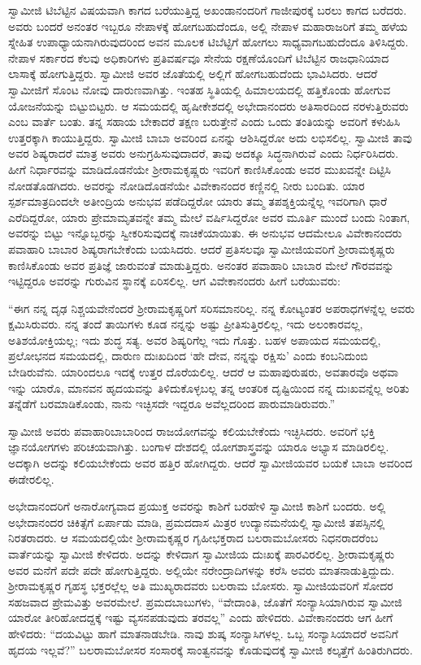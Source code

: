  ಸ್ವಾಮೀಜಿ ಟಿಬೆಟ್ಟಿನ ವಿಷಯವಾಗಿ ಕಾಗದ ಬರೆಯುತ್ತಿದ್ದ ಅಖಂಡಾನಂದರಿಗೆ ಗಾಜೀಪುರಕ್ಕೆ ಬರಲು ಕಾಗದ ಬರೆದರು. ಅವರು ಬಂದರೆ ಅನಂತರ ಇಬ್ಬರೂ ನೇಪಾಳಕ್ಕೆ ಹೋಗಬಹುದೆಂದೂ, ಅಲ್ಲಿ ನೇಪಾಳ ಮಹಾರಾಜರಿಗೆ ತಮ್ಮ ಹಳೆಯ ಸ್ನೇಹಿತ ಉಪಾಧ್ಯಾಯನಾಗಿರುವುದರಿಂದ ಅವನ ಮೂಲಕ ಟಿಬೆಟ್ಟಿಗೆ ಹೋಗಲು ಸಾಧ್ಯವಾಗಬಹುದೆಂದೂ ತಿಳಿಸಿದ್ದರು. ನೇಪಾಳ ಸರ್ಕಾರದ ಕೆಲವು ಅಧಿಕಾರಿಗಳು ಪ್ರತಿವರ್ಷವೂ ಸೇನೆಯ ರಕ್ಷಣೆಯೊಂದಿಗೆ ಟಿಬೆಟ್ಟಿನ ರಾಜಧಾನಿಯಾದ ಲಾಸಾಕ್ಕೆ ಹೋಗುತ್ತಿದ್ದರು. ಸ್ವಾಮೀಜಿ ಅವರ ಜೊತೆಯಲ್ಲಿ ಅಲ್ಲಿಗೆ ಹೋಗಬಹುದೆಂದು ಭಾವಿಸಿದರು. ಆದರೆ ಸ್ವಾಮೀಜಿಗೆ ಸೊಂಟ ನೋವು ದಾರುಣವಾಗಿತ್ತು. ಇಂತಹ ಸ್ಥಿತಿಯಲ್ಲಿ ಹಿಮಾಲಯದಲ್ಲಿ ಹತ್ತಿಕೊಂಡು ಹೋಗುವ ಯೋಜನೆಯನ್ನು ಬಿಟ್ಟುಬಿಟ್ಟರು. ಆ ಸಮಯದಲ್ಲಿ ಹೃಷೀಕೇಶದಲ್ಲಿ ಅಭೇದಾನಂದರು ಅತಿಸಾರದಿಂದ ನರಳುತ್ತಿರುವರು ಎಂಬ ವಾರ್ತೆ ಬಂತು. ತನ್ನ ಸಹಾಯ ಬೇಕಾದರೆ ತಕ್ಷಣ ಬರುತ್ತೇನೆ ಎಂದು ಒಂದು ತಂತಿಯನ್ನು ಅವರಿಗೆ ಕಳುಹಿಸಿ ಉತ್ತರಕ್ಕಾಗಿ ಕಾಯುತ್ತಿದ್ದರು. ಸ್ವಾಮೀಜಿ ಬಾಬಾ ಅವರಿಂದ ಏನನ್ನು ಆಶಿಸಿದ್ದರೋ ಅದು ಲಭಿಸಲಿಲ್ಲ. ಸ್ವಾಮೀಜಿ ತಾವು ಅವರ ಶಿಷ್ಯರಾದರೆ ಮಾತ್ರ ಅವರು ಅನುಗ್ರಹಿಸುವುದಾದರೆ, ತಾವು ಅದಕ್ಕೂ ಸಿದ್ಧನಾಗಿರುವೆ ಎಂದು ನಿರ್ಧರಿಸಿದರು. ಹೀಗೆ ನಿರ್ಧಾರವನ್ನು ಮಾಡಿದೊಡನೆಯೇ ಶ‍್ರೀರಾಮಕೃಷ್ಣರು ಇವರಿಗೆ ಕಾಣಿಸಿಕೊಂಡು ಅವರ ಮುಖವನ್ನೇ ದಿಟ್ಟಿಸಿ ನೋಡತೊಡಗಿದರು. ಅವರನ್ನು ನೋಡಿದೊಡನೆಯೇ ವಿವೇಕಾನಂದರ ಕಣ್ಣಿನಲ್ಲಿ ನೀರು ಬಂದಿತು. ಯಾರ ಸ್ಪರ್ಶಮಾತ್ರದಿಂದಲೇ ಅತೀಂದ್ರಿಯ ಅನುಭವ ಪಡೆದಿದ್ದರೋ ಯಾರು ತಮ್ಮ ತಪಶ್ಶಕ್ತಿಯನ್ನೆಲ್ಲ ಇವರಿಗಾಗಿ ಧಾರೆ ಎರೆದಿದ್ದರೋ, ಯಾರು ಪ್ರೇಮಾಮೃತವನ್ನೇ ತಮ್ಮ ಮೇಲೆ ವರ್ಷಿಸಿದ್ದರೋ ಅವರ ಮೂರ್ತಿ ಮುಂದೆ ಬಂದು ನಿಂತಾಗ, ಅವರನ್ನು ಬಿಟ್ಟು ಇನ್ನೊಬ್ಬರನ್ನು ಸ್ವೀಕರಿಸುವುದಕ್ಕೆ ನಾಚಿಕೆಯಾಯಿತು. ಈ ಅನುಭವ ಆದಮೇಲೂ ವಿವೇಕಾನಂದರು ಪವಾಹಾರಿ ಬಾಬಾರ ಶಿಷ್ಯರಾಗಬೇಕೆಂದು ಬಯಸಿದರು. ಆದರೆ ಪ್ರತಿಸಲವೂ ಸ್ವಾಮೀಜಿಯವರಿಗೆ ಶ‍್ರೀರಾಮಕೃಷ್ಣರು ಕಾಣಿಸಿಕೊಂಡು ಅವರ ಪ್ರತಿಜ್ಞೆ ಜಾರುವಂತೆ ಮಾಡುತ್ತಿದ್ದರು. ಅನಂತರ ಪವಾಹಾರಿ ಬಾಬಾರ ಮೇಲೆ ಗೌರವವನ್ನು ಇಟ್ಟಿದ್ದರೂ ಅವರನ್ನು ಗುರುವಿನ ಸ್ಥಾನಕ್ಕೆ ಏರಿಸಲಿಲ್ಲ. ಆಗ ವಿವೇಕಾನಂದರು ಹೀಗೆ ಬರೆಯುವರು: 

 “ಈಗ ನನ್ನ ದೃಢ ನಿಶ್ಚಯವೇನೆಂದರೆ ಶ‍್ರೀರಾಮಕೃಷ್ಣರಿಗೆ ಸರಿಸಮಾನರಿಲ್ಲ. ನನ್ನ ಕೋಟ್ಯಂತರ ಅಪರಾಧಗಳನ್ನೆಲ್ಲ ಅವರು ಕ್ಷಮಿಸಿರುವರು. ನನ್ನ ತಂದೆ ತಾಯಿಗಳು ಕೂಡ ನನ್ನನ್ನು ಅಷ್ಟು ಪ್ರೀತಿಸುತ್ತಿರಲಿಲ್ಲ, ಇದು ಅಲಂಕಾರವಲ್ಲ, ಅತಿಶಯೋಕ್ತಿಯಲ್ಲ; ಇದು ಶುದ್ಧ ಸತ್ಯ. ಅವರ ಶಿಷ್ಯರಿಗೆಲ್ಲ ಇದು ಗೊತ್ತು. ಬಹಳ ಅಪಾಯದ ಸಮಯದಲ್ಲಿ, ಪ್ರಲೋಭನದ ಸಮಯದಲ್ಲಿ, ದಾರುಣ ದುಃಖದಿಂದ ‘ಹೇ ದೇವ, ನನ್ನನ್ನು ರಕ್ಷಿಸು’ ಎಂದು ಕಂಬನಿದುಂಬಿ ಬೇಡಿರುವೆನು. ಯಾರಿಂದಲೂ ಇದಕ್ಕೆ ಉತ್ತರ ದೊರೆಯಲಿಲ್ಲ. ಆದರೆ ಆ ಮಹಾಪುರುಷರು, ಅವತಾರವೊ ಅಥವಾ ಇನ್ನು ಯಾರೊ, ಮಾನವನ ಹೃದಯವನ್ನು ತಿಳಿದುಕೊಳ್ಳಬಲ್ಲ ತನ್ನ ಆಂತರಿಕ ದೃಷ್ಟಿಯಿಂದ ನನ್ನ ದುಃಖವನ್ನೆಲ್ಲ ಅರಿತು ತನ್ನೆಡೆಗೆ ಬರಮಾಡಿಕೊಂಡು, ನಾನು ಇಚ್ಛಿಸದೇ ಇದ್ದರೂ ಅವೆಲ್ಲದರಿಂದ ಪಾರುಮಾಡಿರುವರು.” 

 ಸ್ವಾಮೀಜಿ ಅವರು ಪವಾಹಾರಿಬಾಬಾರಿಂದ ರಾಜಯೋಗವನ್ನು ಕಲಿಯಬೇಕೆಂದು ಇಚ್ಛಿಸಿದರು. ಅವರಿಗೆ ಭಕ್ತಿ ಜ್ಞಾನಯೋಗಗಳು ಪರಿಚಯವಾಗಿತ್ತು. ಬಂಗಾಳ ದೇಶದಲ್ಲಿ ಯೋಗಶಾಸ್ತ್ರವನ್ನು ಯಾರೂ ಅಭ್ಯಾಸ ಮಾಡಿರಲಿಲ್ಲ. ಅದಕ್ಕಾಗಿ ಅದನ್ನು ಕಲಿಯಬೇಕೆಂದು ಅವರ ಹತ್ತಿರ ಹೋಗಿದ್ದರು. ಆದರೆ ಸ್ವಾಮೀಜಿಯವರ ಬಯಕೆ ಬಾಬಾ ಅವರಿಂದ ಈಡೇರಲಿಲ್ಲ. 

 ಅಭೇದಾನಂದರಿಗೆ ಅನಾರೋಗ್ಯವಾದ ಪ್ರಯುಕ್ತ ಅವರನ್ನು ಕಾಶಿಗೆ ಬರಹೇಳಿ ಸ್ವಾಮೀಜಿ ಕಾಶಿಗೆ ಬಂದರು. ಅಲ್ಲಿ ಅಭೇದಾನಂದರ ಚಿಕಿತ್ಸೆಗೆ ಏರ್ಪಾಡು ಮಾಡಿ, ಪ್ರಮದದಾಸ ಮಿತ್ರರ ಉದ್ಯಾನಮನೆಯಲ್ಲಿ ಸ್ವಾಮೀಜಿ ತಪಸ್ಸಿನಲ್ಲಿ ನಿರತರಾದರು. ಆ ಸಮಯದಲ್ಲಿಯೇ ಶ‍್ರೀರಾಮಕೃಷ್ಣರ ಗೃಹೀಭಕ್ತರಾದ ಬಲರಾಮಬೋಸರು ನಿಧನರಾದರೆಂಬ ವಾರ್ತೆಯನ್ನು ಸ್ವಾಮೀಜಿ ಕೇಳಿದರು. ಅದನ್ನು ಕೇಳಿದಾಗ ಸ್ವಾಮೀಜಿಯ ದುಃಖಕ್ಕೆ ಪಾರವಿರಲಿಲ್ಲ. ಶ‍್ರೀರಾಮಕೃಷ್ಣರು ಅವರ ಮನೆಗೆ ಪದೇ ಪದೇ ಹೋಗುತ್ತಿದ್ದರು. ಅಲ್ಲಿಯೇ ನರೇಂದ್ರಾದಿಗಳನ್ನು ಕರೆಸಿ ಅವರು ಮಾತನಾಡುತ್ತಿದ್ದುದು. ಶ‍್ರೀರಾಮಕೃಷ್ಣರ ಗೃಹಸ್ಥ ಭಕ್ತರಲ್ಲೆಲ್ಲ ಅತಿ ಮುಖ್ಯರಾದವರು ಬಲರಾಮ ಬೋಸರು. ಸ್ವಾಮೀಜಿಯವರಿಗೆ ಸೋದರ ಸಹಜವಾದ ಪ್ರೇಮವಿತ್ತು ಅವರಮೇಲೆ. ಪ್ರಮದಬಾಬುಗಳು, “ವೇದಾಂತಿ, ಜೊತೆಗೆ ಸಂನ್ಯಾಸಿಯಾಗಿರುವ ಸ್ವಾಮೀಜಿ ಯಾರೋ ತೀರಿಹೋದದ್ದಕ್ಕೆ ಇಷ್ಟು ವ್ಯಸನಪಡುವುದು ತರವಲ್ಲ” ಎಂದು ಹೇಳಿದರು. ವಿವೇಕಾನಂದರು ಆಗ ಹೀಗೆ ಹೇಳಿದರು: “ದಯವಿಟ್ಟು ಹಾಗೆ ಮಾತನಾಡಬೇಡಿ. ನಾವು ಶುಷ್ಕ ಸಂನ್ಯಾಸಿಗಳಲ್ಲ. ಒಬ್ಬ ಸಂನ್ಯಾಸಿಯಾದರೆ ಅವನಿಗೆ ಹೃದಯ ಇಲ್ಲವೆ?” ಬಲರಾಮಬೋಸರ ಸಂಸಾರಕ್ಕೆ ಸಾಂತ್ವನವನ್ನು ಕೊಡುವುದಕ್ಕೆ ಸ್ವಾಮೀಜಿ ಕಲ್ಕತ್ತೆಗೆ ಹಿಂತಿರುಗಿದರು. 

